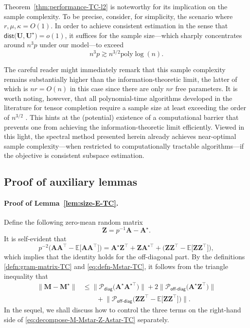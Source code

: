Theorem~\ref{thm:performance-TC-l2} is noteworthy for its implication on the sample complexity. To be precise, consider, for simplicity, the scenario where $r,\mu,\kappa = O(1)$.
In order to achieve consistent estimation in the sense that $\mathsf{dist}\big(\bm{U},\bm{U}^{\star}\big)=o(1)$, it suffices for the sample size---which sharply concentrates around $n^3p$ under our model---to exceed
%
\[
	n^{3}p\gtrsim n^{3/2}\mathrm{poly}\log(n).
\]
%


The careful reader might immediately remark that this sample complexity remains substantially higher than the information-theoretic limit,
the latter of which is $nr=O(n)$ in this case since there are only $nr$ free parameters. It is worth noting, however, that all polynomial-time algorithms developed in the literature for tensor completion require a sample size at least exceeding the order of $n^{3/2}$ \citep{barak2016noisy}. This hints at the (potential) existence of a computational barrier that prevents one from achieving the information-theoretic limit efficiently. Viewed in this light, the spectral method presented herein already achieves near-optimal sample complexity---when restricted to  computationally tractable algorithms---if the objective is consistent subspace estimation.






\subsection{Proof of auxiliary lemmas}
\label{sec:proof-auxiliary-lemmas-TC}




\paragraph{Proof of Lemma~\ref{lem:size-E-TC}.}
Define the following zero-mean random matrix
%
\[
	\bm{Z}=p^{-1}\bm{A}-\bm{A}^{\star}.
\]
%
It is  self-evident that
%
\[
  p^{-2} \big(\bm{A}\bm{A}^{\top}-\mathbb{E}\big[\bm{A}\bm{A}^{\top}\big]\big)=\bm{A}^{\star}\bm{Z}^{\top}+\bm{Z}\bm{A}^{\star\top}
+ \big( \bm{Z}\bm{Z}^{\top}-\mathbb{E}\big[\bm{Z}\bm{Z}^{\top}\big] \big),
\]
%
which implies that the identity holds for the off-diagonal part.  By the definitions
\eqref{defn:gram-matrix-TC} and \eqref{eq:defn-Mstar-TC}, it follows from the triangle inequality that
%
\begin{align}
\big\|\bm{M}-\bm{M}^{\star}\big\| & \leq\big\|\mathcal{P}_{\mathsf{diag}}\big(\bm{A}^{\star}\bm{A}^{\star\top}\big)\big\|+2\big\|\mathcal{P}_{\mathsf{off}\text{-}\mathsf{diag}}\big(\bm{A}^{\star}\bm{Z}^{\top}\big)\big\|\nonumber \\
	& \qquad+\big\|\mathcal{P}_{\mathsf{off}\text{-}\mathsf{diag}}\big(\bm{Z}\bm{Z}^{\top} -\mathbb{E}\big[\bm{Z}\bm{Z}^{\top} \big] \big)\big\|.
	\label{eq:decompose-M-Mstar-Z-Astar-TC}
\end{align}
%
In the sequel, we shall discuss how to control the three terms on the right-hand side of \eqref{eq:decompose-M-Mstar-Z-Astar-TC} separately.


